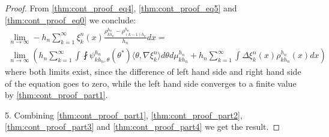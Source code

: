 \begin{proof}
From \ref{thm:cont_proof_eq4}, \ref{thm:cont_proof_eq5} and \ref{thm:cont_proof_eq0} we conclude:
\begin{multline} \label{thm:cont_proof_part4}
\lim_{n \rightarrow \infty} - h_n \sum_{k=1}^{\infty} \xi_k^n(x)\frac{\rho_{kh_n}^{h_n} - \rho_{(k-1)h_n}^{h_n}}{h_n} dx = \\
\lim_{n \rightarrow \infty} \left( h_n \sum_{k=1}^{\infty} \int \fint \psi_{kh_n, \theta}^{h_n} (\theta^{*}) \langle \theta, \nabla \xi_{k}^n \rangle d \theta d\mu_{kh_n}^{h_n} + h_n \sum_{k=1}^{\infty} \int \Delta \xi_k^n(x) \rho_{kh_n}^{h_n}(x) dx  \right)
\end{multline}
where both limits exist, since the difference of left hand side and right hand side of the equation goes to zero, while the left hand side converges to a finite value by \ref{thm:cont_proof_part1}.

5. Combining \ref{thm:cont_proof_part1}, \ref{thm:cont_proof_part2}, \ref{thm:cont_proof_part3} and \ref{thm:cont_proof_part4} we get the result.
\end{proof}
